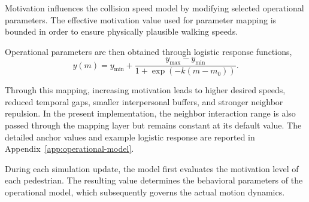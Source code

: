 \documentclass[pdflatex,sn-mathphys-num]{sn-jnl}%
\theoremstyle{thmstyleone}%
\theoremstyle{thmstyletwo}%
\theoremstyle{thmstylethree}%
\begin{document}
Motivation influences the collision speed model by modifying selected
operational parameters. The effective motivation value used for parameter
mapping is bounded in order to ensure physically plausible walking speeds.

Operational parameters are then obtained through logistic response
functions,
\begin{equation}
y(m) = y_{\min} + \frac{y_{\max}-y_{\min}}{1+\exp(-k(m-m_0))}.
\label{eq:logistic}    
\end{equation}

Through this mapping, increasing motivation leads to higher desired
speeds, reduced temporal gaps, smaller interpersonal buffers, and
stronger neighbor repulsion. In the present implementation, the neighbor
interaction range is also passed through the mapping layer but remains
constant at its default value. The detailed anchor values and example
logistic response are reported in Appendix~\ref{app:operational-model}.

During each simulation update, the model first evaluates the motivation
level of each pedestrian. The resulting value determines the behavioral
parameters of the operational model, which subsequently governs the
actual motion dynamics.





\end{document}
